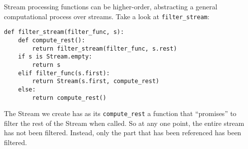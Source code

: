 Stream processing functions can be higher-order, abstracting a general
computational process over streams. Take a look at \texttt{filter\_stream}:

\begin{lstlisting}
def filter_stream(filter_func, s):
    def compute_rest():
        return filter_stream(filter_func, s.rest)
    if s is Stream.empty:
        return s
    elif filter_func(s.first):
        return Stream(s.first, compute_rest)
    else:
        return compute_rest()
\end{lstlisting}

The Stream we create has as its \texttt{compute\_rest} a function that
``promises'' to filter the rest of the Stream when called. So at any one point,
the entire stream has not been filtered. Instead, only the part that has been
referenced has been filtered.
